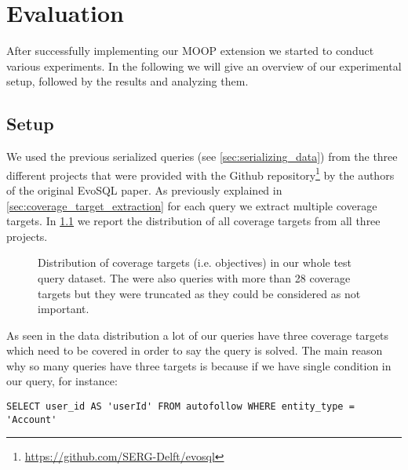 \chapter{Evaluation}
\label{cha:evaluation}

After successfully implementing our MOOP extension we started to conduct various experiments. In the following we will give an overview of our experimental setup, followed by the results and analyzing them.

\section{Setup}
\label{sec:experimental_setup}
We used the previous serialized queries (see \cref{sec:serializing_data}) from the three different projects that were provided with the Github repository\footnote[2]{\href{https://github.com/SERG-Delft/evosql}{https://github.com/SERG-Delft/evosql}} by the authors of the original EvoSQL paper. As previously explained in \cref{sec:coverage_target_extraction} for each query we extract multiple coverage targets. In \cref{fig:cov_targets_dist} we report the distribution of all coverage targets from all three projects.

\begin{figure}
	\centering
	\caption{Distribution of coverage targets (i.e. objectives) in our whole test query dataset. The were also queries with more than 28 coverage targets but they were truncated as they could be considered as not important.}
	\label{fig:cov_targets_dist}
\end{figure}

As seen in the data distribution a lot of our queries have three coverage targets which need to be covered in order to say the query is solved. The main reason why so many queries have three targets is because if we have single condition in our query, for instance:
\begin{verbatim}
SELECT user_id AS 'userId' FROM autofollow WHERE entity_type = 'Account'
\end{verbatim}

